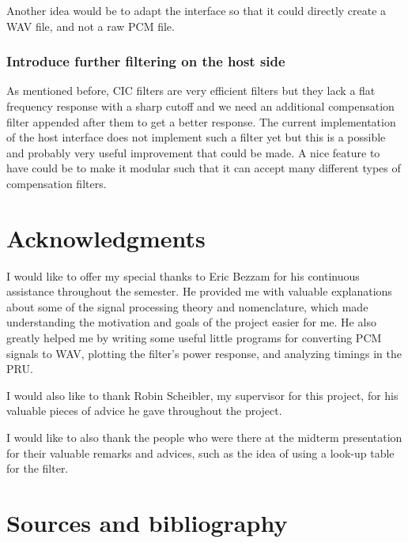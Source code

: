 \documentclass[]{report}
\begin{document}
Another idea would be to adapt the interface so that it could directly create a WAV file, and not a raw PCM file.

\hypertarget{introduce-further-filtering-on-the-host-side}{%
\subsection{Introduce further filtering on the host
side}\label{introduce-further-filtering-on-the-host-side}}

As mentioned before, CIC filters are very efficient filters but they lack a flat frequency response with a sharp cutoff and we need an additional compensation filter appended after them to get a better response. The current implementation of the host interface does not implement such a filter yet but this is a possible and probably very useful improvement that could be made. A nice feature to have could be to make it modular such that it can accept many different types of compensation filters.

\hypertarget{acknowledgments}{%
\chapter{Acknowledgments}\label{acknowledgments}}

I would like to offer my special thanks to Eric Bezzam for his continuous assistance throughout the semester. He provided me with valuable explanations about some of the signal processing theory and nomenclature, which made understanding the motivation and goals of the project easier for me. He also greatly helped me by writing some useful little programs for converting PCM signals to WAV, plotting the filter's power response, and analyzing timings in the PRU.

I would also like to thank Robin Scheibler, my supervisor for this project, for his valuable pieces of advice he gave throughout the project.

I would like to also thank the people who were there at the midterm presentation for their valuable remarks and advices, such as the idea of using a look-up table for the filter.

\hypertarget{sources-and-bibliography}{%
\chapter*{Sources and bibliography}\label{sources-and-bibliography}}
\end{document}
